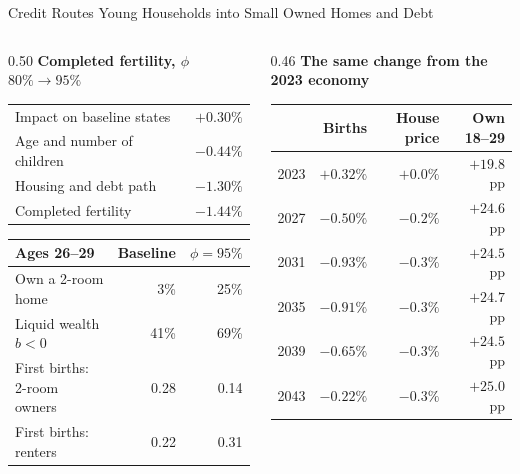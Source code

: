 \begin{frame}[t]{Credit Routes Young Households into Small Owned Homes and Debt}
\linespread{1.0}\footnotesize\selectfont
\begin{columns}[T,onlytextwidth]
\begin{column}{0.50\textwidth}
\textbf{Completed fertility, $\phi$ $80\%\to95\%$}
\smallskip

\scriptsize\setlength{\tabcolsep}{3pt}\renewcommand{\arraystretch}{1.05}
\begin{tabular}{@{}lr@{}}
\toprule
Impact on baseline states & $+0.30\%$ \\
Age and number of children & $-0.44\%$ \\
Housing and debt path & $-1.30\%$ \\
\midrule
Completed fertility & $-1.44\%$ \\
\bottomrule
\end{tabular}
\smallskip

\begin{tabular}{@{}lrr@{}}
\toprule
Ages 26--29 & Baseline & $\phi=95\%$ \\
\midrule
Own a 2-room home & 3\% & 25\% \\
Liquid wealth $b<0$ & 41\% & 69\% \\
First births: 2-room owners & 0.28 & 0.14 \\
First births: renters & 0.22 & 0.31 \\
\bottomrule
\end{tabular}
\end{column}
\begin{column}{0.46\textwidth}
\textbf{The same change from the 2023 economy}
\smallskip

\scriptsize\setlength{\tabcolsep}{3pt}\renewcommand{\arraystretch}{1.05}
\begin{tabular}{@{}lrrr@{}}
\toprule
 & Births & House price & Own 18--29 \\
\midrule
2023 & $+0.32\%$ & $+0.0\%$ & $+19.8$ pp \\
2027 & $-0.50\%$ & $-0.2\%$ & $+24.6$ pp \\
2031 & $-0.93\%$ & $-0.3\%$ & $+24.5$ pp \\
2035 & $-0.91\%$ & $-0.3\%$ & $+24.7$ pp \\
2039 & $-0.65\%$ & $-0.3\%$ & $+24.5$ pp \\
2043 & $-0.22\%$ & $-0.3\%$ & $+25.0$ pp \\
\bottomrule
\end{tabular}
\smallskip


\end{column}
\end{columns}
\end{frame}
